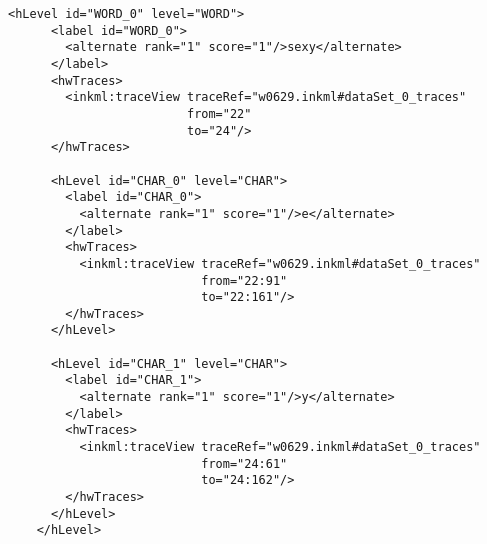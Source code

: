 \begin{xmlcode}
  \begin{lstlisting}[emph={hLevel,hwTraces},
                     emphstyle={\color{blue}\textbf},
                     emph={[2]id,level},
                     emphstyle={[2]\color{red}},
                     caption={Demonstration of the \emph{hLevel} tag in UPX},
                     label=lst:hLevelinupx]
    <hLevel id="WORD_0" level="WORD">
      <label id="WORD_0">
        <alternate rank="1" score="1"/>sexy</alternate>
      </label>
      <hwTraces> 
        <inkml:traceView traceRef="w0629.inkml#dataSet_0_traces" 
                         from="22" 
                         to="24"/>
      </hwTraces>

      <hLevel id="CHAR_0" level="CHAR">
        <label id="CHAR_0">
          <alternate rank="1" score="1"/>e</alternate>
        </label>
        <hwTraces> 
          <inkml:traceView traceRef="w0629.inkml#dataSet_0_traces" 
                           from="22:91" 
                           to="22:161"/>
        </hwTraces>
      </hLevel>

      <hLevel id="CHAR_1" level="CHAR">
        <label id="CHAR_1">
          <alternate rank="1" score="1"/>y</alternate>
        </label>
        <hwTraces> 
          <inkml:traceView traceRef="w0629.inkml#dataSet_0_traces" 
                           from="24:61" 
                           to="24:162"/>
        </hwTraces>
      </hLevel>
    </hLevel>
  \end{lstlisting}
\end{xmlcode}

